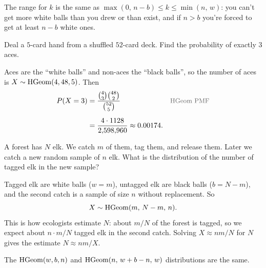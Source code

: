 \bigskip

\begin{remark}
The range for $k$ is the same as $\max(0,\, n - b) \le k \le \min(n,\, w)$: you can't get more white balls than you drew or than exist, and if $n > b$ you're forced to get at least $n - b$ white ones.
\end{remark}

\bigskip

\begin{example}\label{ex:aces}
Deal a $5$-card hand from a shuffled $52$-card deck. Find the probability of exactly $3$ aces.
\end{example}

\medskip

\begin{solution}
Aces are the ``white balls'' and non-aces the ``black balls'', so the number of aces is $X \sim \operatorname{HGeom}(4, 48, 5)$. Then
\medskip
\begin{align*}
P(X = 3)
  &= \frac{\binom{4}{3}\binom{48}{2}}{\binom{52}{5}}
  && \by{HGeom PMF} \\[0.6em]
  &= \frac{4 \cdot 1128}{2{,}598{,}960}
   \approx 0.00174.
\end{align*}
\end{solution}

\bigskip

\begin{example}\label{ex:elk}
A forest has $N$ elk. We catch $m$ of them, tag them, and release them. Later we catch a new random sample of $n$ elk. What is the distribution of the number of tagged elk in the new sample?
\end{example}

\medskip

\begin{solution}
Tagged elk are white balls ($w = m$), untagged elk are black balls ($b = N - m$), and the second catch is a sample of size $n$ without replacement. So
\medskip
\[
X \sim \operatorname{HGeom}(m,\, N - m,\, n).
\]
\medskip
This is how ecologists estimate $N$: about $m/N$ of the forest is tagged, so we expect about $n \cdot m/N$ tagged elk in the second catch. Solving $X \approx nm/N$ for $N$ gives the estimate $N \approx nm/X$.
\end{solution}

\bigskip

\begin{theorem}\label{thm:hgeomsym}
The $\operatorname{HGeom}(w, b, n)$ and $\operatorname{HGeom}(n,\, w + b - n,\, w)$ distributions are the same.
\end{theorem}

